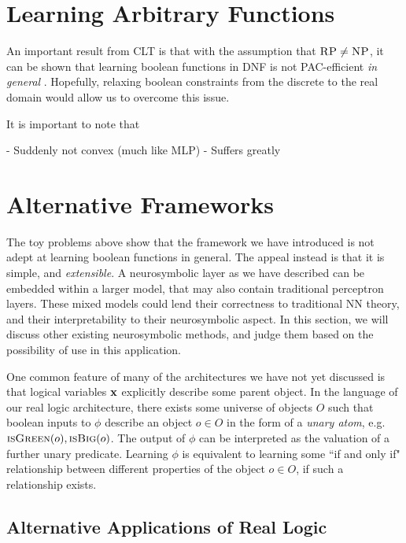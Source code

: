 \pagebreak

\section{Learning Arbitrary Functions}
\label{section:realdnfs}

An important result from CLT is that with the assumption that $\textsc{RP} \neq \textsc{NP}$, it can be shown that learning boolean functions in DNF is not PAC-efficient \textit{in general} \cite{clt}. Hopefully, relaxing boolean constraints from the discrete to the real domain would allow us to overcome this issue.



It is important to note that 

- Suddenly not convex (much like MLP)
- Suffers greatly


\section{Alternative Frameworks}

The toy problems above show that the framework we have introduced is not adept at learning boolean functions in general. The appeal instead is that it is simple, and \textit{extensible}. A neurosymbolic layer as we have described can be embedded within a larger model, that may also contain traditional perceptron layers. These mixed models could lend their correctness to traditional NN theory, and their interpretability to their neurosymbolic aspect. In this section, we will discuss other existing neurosymbolic methods, and judge them based on the possibility of use in this application.

One common feature of many of the architectures we have not yet discussed is that logical variables $\mathbf{x}$ explicitly describe some parent object. In the language of our real logic architecture, there exists some universe of objects $O$ such that boolean inputs to $\phi$ describe an object $o \in O$ in the form of a \textit{unary atom}, e.g. $\textsc{isGreen}(o), \textsc{isBig}(o)$. The output of $\phi$ can be interpreted as the valuation of a further unary predicate. Learning $\phi$ is equivalent to learning some ``if and only if" relationship between different properties of the object $o\in O$, if such a relationship exists. 

\subsection{Alternative Applications of Real Logic}

